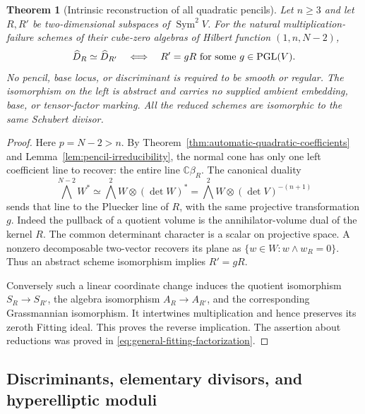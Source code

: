 \documentclass[11pt,reqno]{amsart}
\numberwithin{equation}{section}
\newtheorem{theorem}{Theorem}[section]
\theoremstyle{definition}\newtheorem{definition}[theorem]{Definition}
\theoremstyle{remark}\newtheorem{remark}[theorem]{Remark}
\newcommand{\C}{\mathbb C}\newcommand{\Q}{\mathbb Q}
\DeclareMathOperator{\Sym}{Sym}\DeclareMathOperator{\Gr}{Gr}
\begin{document}
\begin{theorem}[Intrinsic reconstruction of all quadratic pencils]
\label{thm:natural-pencil-reconstruction}
Let \(n\ge3\) and let \(R,R'\) be two-dimensional subspaces
of \(\Sym^2V\).  For the natural multiplication-failure schemes
of their cube-zero algebras of Hilbert function \((1,n,N-2)\),
\begin{equation}\label{eq:natural-pencil-torelli}
 \widehat D_R\simeq\widehat D_{R'}
 \quad\Longleftrightarrow\quad
 R'=gR\text{ for some }g\in\operatorname{PGL}(V).
\end{equation}
No pencil, base locus, or discriminant is required to be smooth or
regular.  The isomorphism on the left is abstract and carries no
supplied ambient embedding, base, or tensor-factor marking.  All the
reduced schemes are isomorphic to the same Schubert divisor.
\end{theorem}
\begin{proof}
Here \(p=N-2>n\).  By
Theorem~\ref{thm:automatic-quadratic-coefficients} and
Lemma~\ref{lem:pencil-irreducibility}, the normal cone has only one
left coefficient line to recover: the entire line \(\C\beta_R\).
The canonical duality
\begin{equation}\label{eq:pencil-exterior-duality}
 \bigwedge^{N-2}W^*\simeq
       \bigwedge^2W\otimes(\det W)^*
       =\bigwedge^2W\otimes(\det V)^{-(n+1)}
\end{equation}
sends that line to the Pluecker line of \(R\), with the same
projective transformation \(g\).  Indeed the pullback of a
quotient volume is the annihilator-volume dual of the kernel
\(R\).  The common determinant character is a scalar on
projective space.  A nonzero decomposable two-vector recovers its
plane as \(\{w\in W:w\wedge w_R=0\}\).  Thus an abstract
scheme isomorphism implies \(R'=gR\).

Conversely such a linear coordinate change induces the quotient
isomorphism \(S_R\to S_{R'}\), the algebra isomorphism
\(A_R\to A_{R'}\), and the corresponding Grassmannian isomorphism.
It intertwines multiplication and hence preserves its zeroth Fitting
ideal.  This proves the reverse implication.  The assertion about
reductions was proved in \eqref{eq:general-fitting-factorization}.
\end{proof}

\subsection{Discriminants, elementary divisors, and hyperelliptic moduli}
\end{document}
